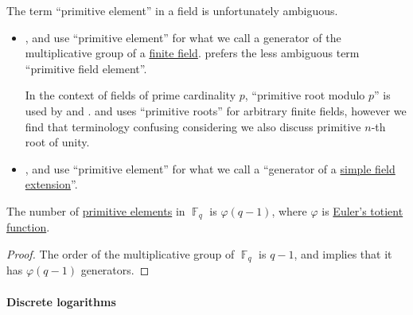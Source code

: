 \begin{remark}\label{rem:primitive_element_terminology}
  The term \enquote{primitive element} in a field is unfortunately ambiguous.

  \begin{itemize}
    \item {},  and  use \enquote{primitive element} for what we call a generator of the multiplicative group of a \hyperref[def:finite_field]{finite field}.  prefers the less ambiguous term \enquote{primitive field element}.

    In the context of fields of prime cardinality \( p \), \enquote{primitive root modulo \( p \)} is used by  and .  and  uses \enquote{primitive roots} for arbitrary finite fields, however we find that terminology confusing considering we also discuss primitive \( n \)-th root of unity.

    \item {},  and  use \enquote{primitive element} for what we call a \enquote{generator of a \hyperref[def:simple_field_extension]{simple field extension}}.
  \end{itemize}
\end{remark}

\begin{proposition}\label{thm:primitive_element_cardinality}
  The number of \hyperref[def:finite_field_primitive_element]{primitive elements} in \( \BbbF_q \) is \( \varphi(q - 1) \), where \( \varphi \) is \hyperref[def:eulers_totient_function]{Euler's totient function}.
\end{proposition}
\begin{proof}
  The order of the multiplicative group of \( \BbbF_q \) is \( q - 1 \), and  implies that it has \( \varphi(q - 1) \) generators.
\end{proof}

\paragraph{Discrete logarithms}

